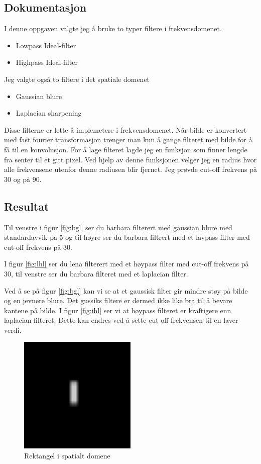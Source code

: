 \documentclass[a4paper, 12pt]{article}
\begin{document}
\subsection{Dokumentasjon}
I denne oppgaven valgte jeg å bruke to typer filtere i frekvensdomenet.
\begin{itemize}
\item Lowpass Ideal-filter
\item Highpass Ideal-filter
\end{itemize}

Jeg valgte også to filtere i det spatiale domenet

\begin{itemize}
\item Gaussian blure
\item Laplacian sharpening
\end{itemize}

Disse filterne er lette å implemetere i frekvensdomenet. Når bilde er konvertert med fast fourier transformasjon trenger man kun å gange filteret med bilde for å få til en konvolusjon. For å lage filteret lagde jeg en funksjon som finner lengde fra senter til et gitt pixel. Ved hjelp av denne funksjonen velger jeg en radius hvor alle frekvensene utenfor denne radiusen blir fjernet. Jeg prøvde cut-off frekvens på 30 og på 90.
\subsection{Resultat}
Til venstre i  figur \ref{fig:bgl} ser du barbara filterert med gaussian blure med standardavvik på 5 og til høyre ser du barbara filtrert med et lavpass filter med cut-off frekvens på 30.

I figur \ref{fig:lhl} ser du lena filterert med et høypass filter med cut-off frekvens på 30, til venstre ser du barbara filteret med et laplacian filter.

 Ved å se på figur \ref{fig:bgl} kan vi se at et gaussisk filter gir mindre støy på bilde og en jevnere blure. Det gussiks filtere er dermed ikke like bra til å bevare kantene på bilde. I figur \ref{fig:ihl} ser vi at høypass filteret er kraftigere enn laplacian filteret. Dette kan endres ved å sette cut off frekvensen til en laver verdi.


\begin{figure}[h]
  \centering
  \includegraphics[width=0.5\textwidth]{images/rektangel.png}
  \caption{Rektangel i spatialt domene}
  \label{fig:rektangel}
\end{figure}
\end{document}
